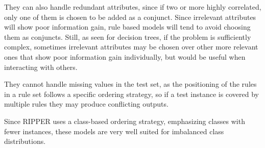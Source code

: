 They can also handle redundant attributes, since if two or more highly correlated, only one of them is chosen to be added as a conjunct. Since irrelevant attributes will show poor information gain, rule based models will tend to avoid choosing them as conjuncts. Still, as seen for decision trees, if the problem is sufficiently complex, sometimes irrelevant attributes may be chosen over other more relevant ones that show poor information gain individually, but would be useful when interacting with others.

They cannot handle missing values in the test set, as the positioning of the rules in a rule set follows a specific ordering strategy, so if a test instance is covered by multiple rules they may produce conflicting outputs.

Since RIPPER uses a class-based ordering strategy, emphasizing classes with fewer instances, these models are very well suited for imbalanced class distributions. 